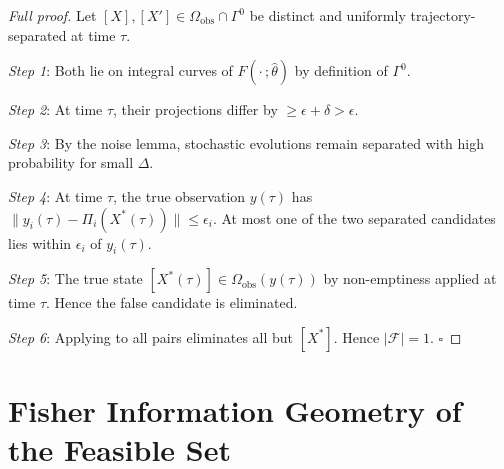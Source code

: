 \documentclass[12pt, oneside]{article}
\begin{document}
\begin{proof}[Full proof]
Let $[X],[X'] \in \Omega_{\mathrm{obs}} \cap \Gamma^0$ be distinct and uniformly
trajectory-separated at time $\tau$.

\textit{Step 1}: Both lie on integral curves of $F(\cdot\,;\hat{\theta})$ by definition of
$\Gamma^0$.

\textit{Step 2}: At time $\tau$, their projections differ by $\ge \epsilon + \delta > \epsilon$.

\textit{Step 3}: By the noise lemma, stochastic evolutions remain separated with high
probability for small $\Delta$.

\textit{Step 4}: At time $\tau$, the true observation $y(\tau)$ has
$\|y_i(\tau) - \Pi_i(X^*(\tau))\| \le \epsilon_i$. At most one of the two separated
candidates lies within $\epsilon_i$ of $y_i(\tau)$.

\textit{Step 5}: The true state $[X^*(\tau)] \in \Omega_{\mathrm{obs}}(y(\tau))$ by
non-emptiness applied at time $\tau$. Hence the false candidate is eliminated.

\textit{Step 6}: Applying to all pairs eliminates all but $[X^*]$. Hence
$|\mathcal{F}| = 1$. $\square$
\end{proof}

\section{Fisher Information Geometry of the Feasible Set}
\label{app:fisher}
\end{document}
